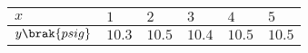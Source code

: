 \begin{tabular}{|l|l|l|l|l|l|}
\hline
$x$ & $1$ & $2$ & $3$ & $4$ & $5$\\
\hline
$y\brak{psig}$ & $10.3$ & $10.5$ & $10.4$ & $10.5$ & $10.5$\\
\hline
\end{tabular}
